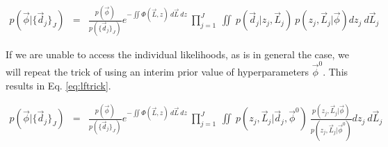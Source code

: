 \documentclass[preprint]{aastex}
\begin{document}
\begin{eqnarray}
\label{eq:lfexpand}
p(\vec{\phi}|\{\vec{d}_{j}\}_{J}) &=& \frac{p(\vec{\phi})}{p(\{\vec{d}_{j}\}_{J})}e^{-\iint \Phi(\vec{L},z)\ d\vec{L}\ dz}\ \prod_{j=1}^{J}\ \iint\ p(\vec{d}_{j}|z_{j},\vec{L}_{j})\ p(z_{j},\vec{L}_{j}|\vec{\phi}) dz_{j}\ d\vec{L}_{j}
\end{eqnarray}

If we are unable to access the individual likelihoods, as is in general the case, we will repeat the trick of using an interim prior value of hyperparameters $\vec{\phi}^{0}$.  This results in Eq. \ref{eq:lftrick}.

\begin{eqnarray}
\label{eq:lftrick}
p(\vec{\phi}|\{\vec{d}_{j}\}_{J}) &=& \frac{p(\vec{\phi})}{p(\{\vec{d}_{j}\}_{J})}e^{-\iint \Phi(\vec{L},z)\ d\vec{L}\ dz}\ \prod_{j=1}^{J}\ \iint\ p(z_{j},\vec{L}_{j}|\vec{d}_{j},\vec{\phi}^{0})\ \frac{p(z_{j},\vec{L}_{j}|\vec{\phi})}{p(z_{j},\vec{L}_{j}|\vec{\phi}^{0})} dz_{j}\ d\vec{L}_{j}
\end{eqnarray}





\end{document}
